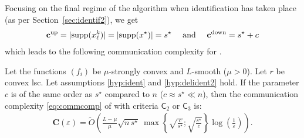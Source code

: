 Focusing on the final regime of the algorithm when identification has taken place (as per Section~\ref{sec:identif2}), we get
\begin{align*}
    \mathbf{c^{\mathrm{up}}} = |\mathrm{supp}(x_\ell^k)| = |\mathrm{supp}(x^\star)| = s^\star \quad\text{ and }\quad \mathbf{c^{\mathrm{down}}} = s^\star + c
\end{align*}
which leads to the following communication complexity for \recoalgo.

\begin{theorem}\label{th:com}
Let the functions $(f_i)$ be $\mu$-strongly convex and $L$-smooth ($\mu>0$). Let $r$ be convex lsc. Let assumptions \ref{hyp:ident} and \ref{hyp:delident2} hold.
If the parameter $c$ is of the same order as $s^\star$ compared to $n$ ($c\approx s^\star \ll n$), then the communication complexity \eqref{eq:commcomp} of \recoalgo with criteria $\mathsf{C}_2$ or $\mathsf{C}_3$ is:
\begin{align*}
     \mathbf{C}(\varepsilon) = \tilde{O}\left( \frac{L-\mu}{\mu} \sqrt{n \, s^\star } ~ \max \left\{\sqrt{\frac{c}{s^\star}};\sqrt{\frac{s^\star}{c}} \right\} \log\left( \frac{1}{\varepsilon} \right) \right).
\end{align*}
\end{theorem}

